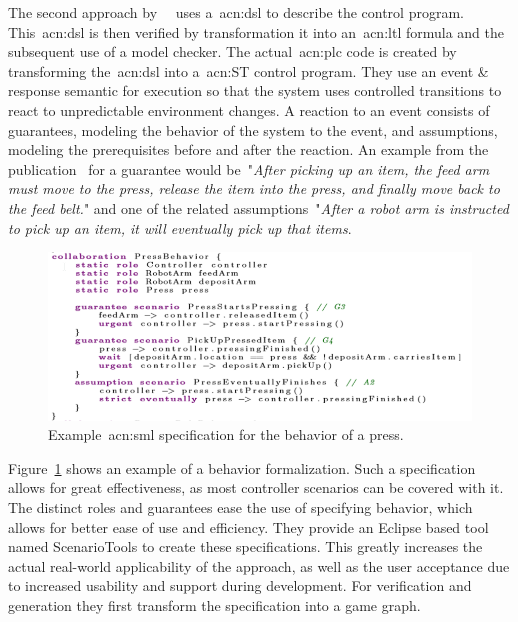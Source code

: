 The second approach by~\citeauthor{10.1007/978-3-319-74730-9_23}~\cite{10.1007/978-3-319-74730-9_23} uses a~\acrfull{acn:dsl} to describe the control program.
This~\acrshort{acn:dsl} is then verified by transformation it into an~\acrshort{acn:ltl} formula and the subsequent use of a model checker.
The actual~\acrshort{acn:plc} code is created by transforming the~\acrshort{acn:dsl} into a~\acrshort{acn:ST} control program.
They use an event \& response semantic for execution so that the system uses controlled transitions to react to unpredictable environment changes.
A reaction to an event consists of guarantees, modeling the behavior of the system to the event, and assumptions, modeling the prerequisites before and after the reaction.
An example from the publication~\cite{10.1007/978-3-319-74730-9_23} for a guarantee would be~"\textit{After picking up an item, the feed arm must move to the press, release the item into the press, and finally move back to the feed belt.}" and one of the related assumptions~"\textit{After a robot arm is instructed to pick up an item, it will eventually pick up that items}.
\begin{figure}[h]
	\centering
	\includegraphics[width=\textwidth]{./Figures/sml_press_beh.png}
	\caption[\acrshort{acn:sml} specification example.]{Example~\acrshort{acn:sml} specification for the behavior of a press.~\cite{10.1007/978-3-319-74730-9_23}}
	\label{fig:sml_press}
\end{figure}
Figure~\ref{fig:sml_press} shows an example of a behavior formalization.
Such a specification allows for great effectiveness, as most controller scenarios can be covered with it.
The distinct roles and guarantees ease the use of specifying behavior, which allows for better ease of use and efficiency.
They provide an Eclipse based tool named ScenarioTools to create these specifications.
This greatly increases the actual real-world applicability of the approach, as well as the user acceptance due to increased usability and support during development.
For verification and generation they first transform the specification into a game graph.

